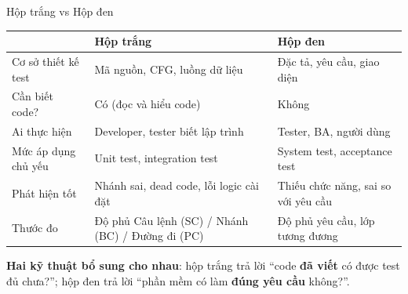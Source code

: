 \documentclass[aspectratio=169,12pt]{beamer}
\begin{document}
\begin{frame}{Hộp trắng vs Hộp đen}
  \renewcommand{\arraystretch}{1.2}
  \footnotesize
  \begin{tabularx}{\textwidth}{l>{\raggedright\arraybackslash}X>{\raggedright\arraybackslash}X}
    \toprule
     & \textbf{Hộp trắng} & \textbf{Hộp đen} \\
    \midrule
    Cơ sở thiết kế test & Mã nguồn, CFG, luồng dữ liệu & Đặc tả, yêu cầu, giao diện \\
    Cần biết code? & Có (đọc và hiểu code) & Không \\
    Ai thực hiện & Developer, tester biết lập trình & Tester, BA, người dùng \\
    Mức áp dụng chủ yếu & Unit test, integration test & System test, acceptance test \\
    Phát hiện tốt & Nhánh sai, dead code, lỗi logic cài đặt & Thiếu chức năng, sai so với yêu cầu \\
    Thước đo & Độ phủ Câu lệnh (SC) / Nhánh (BC) / Đường đi (PC) & Độ phủ yêu cầu, lớp tương đương \\
    \bottomrule
  \end{tabularx}
  \renewcommand{\arraystretch}{1}

  \vspace{0.3em}
  {\small \textbf{Hai kỹ thuật bổ sung cho nhau}: hộp trắng trả lời ``code
  \textbf{đã viết} có được test đủ chưa?''; hộp đen trả lời ``phần mềm có làm
  \textbf{đúng yêu cầu} không?''.}
\end{frame}
\end{document}
